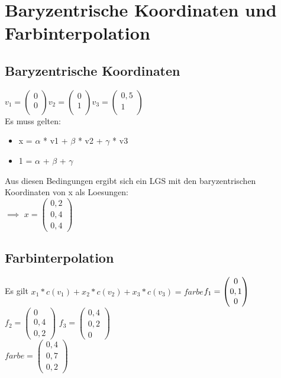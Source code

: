 \documentclass[10pt,a4paper]{article}
\begin{document}
\section{Baryzentrische Koordinaten und Farbinterpolation}

\subsection{Baryzentrische Koordinaten}

$
v_1 =\begin{pmatrix}
0 \\
0 \\

\end{pmatrix}
$$
v_2 =\begin{pmatrix}
0 \\
1 \\

\end{pmatrix}
$$
v_3 =\begin{pmatrix}
	0,5 \\
	1\\
	 
\end{pmatrix}
$\\
Es muss gelten:

\begin{itemize}
 \item  x = $\alpha$ * v1 + $\beta$ * v2 + $\gamma$ * v3
 \item  1 = $\alpha$ + $\beta$ + $\gamma$
\end{itemize}

Aus diesen Bedingungen ergibt sich ein LGS mit den baryzentrischen Koordinaten von x als Loesungen:
\\
$\implies$
$
x =\begin{pmatrix}
0,2 \\
0,4 \\
0,4 
\end{pmatrix}
$



\subsection{Farbinterpolation}

Es gilt $x_1*c(v_1)+x_2*c(v_2)+x_3*c(v_3) = farbe$$
\\f_1 =\begin{pmatrix}
0 \\
0,1 \\
0
\end{pmatrix}
$ $
f_2 =\begin{pmatrix}
0 \\
0,4 \\
 0,2
\end{pmatrix}
$ 
$
f_3 =\begin{pmatrix}
0,4  \\
0,2\\
0
\end{pmatrix}
$
\\
$
farbe =\begin{pmatrix}
0,4 \\
0,7\\
 0,2
\end{pmatrix}
$ 
\end{document}
